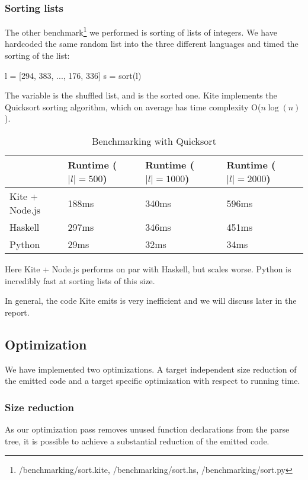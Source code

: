 \subsubsection{Sorting lists}

The other benchmark\footnote{/benchmarking/sort.kite, /benchmarking/sort.hs, /benchmarking/sort.py} we performed is sorting of lists of integers. We have hardcoded the same random list into the three different languages and timed the sorting of the list:

\begin{kite}
l = [294, 383, ..., 176, 336]
s = sort(l)
\end{kite}

The variable  is the shuffled list, and  is the sorted one. Kite implements the  Quicksort sorting algorithm, which on average has time complexity O($n \log(n)$).

\begin{table}[h]
  \centering
  \begin{tabular}{|l|l|l|l|}
    \hline
                   & Runtime ($|l| = 500$) & Runtime ($|l| = 1000$) & Runtime ($|l| = 2000$) \\
    \hline
    Kite + Node.js & 188ms                 & 340ms                  & 596ms                  \\
    Haskell        & 297ms                 & 346ms                  & 451ms                  \\
    Python         & 29ms                  & 32ms                   & 34ms                   \\
    \hline
  \end{tabular}
  \caption{Benchmarking with Quicksort}
\end{table}

Here Kite + Node.js performs on par with Haskell, but scales worse. Python is incredibly fast at sorting lists of this size.

In general, the code Kite emits is very inefficient and we will discuss later in the report.


\subsection{Optimization}

We have implemented two optimizations. A target independent size reduction of the emitted code and a target specific optimization with respect to running time.

\subsubsection{Size reduction}
As our optimization pass removes unused function declarations from the parse tree, it is possible to achieve a substantial reduction of the emitted code.

